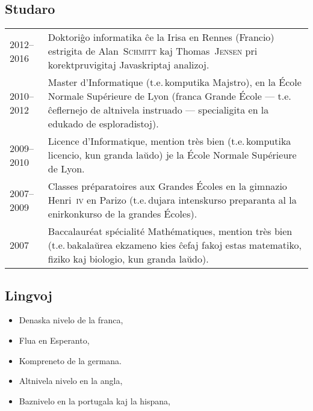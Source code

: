 \documentclass[12pt,a4paper]{article}
\makeatletter
\newcommand{\fr}[1]{\foreignlanguage{french}{{#1}}}
\newcommand{\fr}[1]{\foreignlanguage{french}{{#1}}}
\newcommand{\ie}{t.e.\,}
\newenvironment{datecvsection}[1]%
               {\subsection*{#1}%
                 \noindent \begin{tabular}{@{}p{\annee}p{\texte}@{}}}
               {\end{tabular}}
\newenvironment{cvsection}[1]%
               {\subsection*{#1}}
               {}
\newcommand\familyName{\textsc}
\newcommand\placeName{}
\makeatother
\begin{document}
\begin{datecvsection}{Studaro}

    2012–2016 & Doktoriĝo informatika ĉe la \placeName{Irisa} en \placeName{Rennes} (\placeName{Francio}) estrigita de Alan~\familyName{Schmitt} kaj Thomas~\familyName{Jensen} pri korektpruvigitaj {Javaskript}aj analizoj. \\

    2010–2012 & \fr{Master d’Informatique} (\ie komputika Majstro), en la \fr{\placeName{École Normale Supérieure de Lyon}} (franca \fr{Grande École} — \ie ĉeflernejo de altnivela instruado — specialigita en la edukado de esploradistoj). \\

    2009–2010 & \fr{Licence d’Informatique, mention très bien} (\ie komputika licencio, kun granda laŭdo) je la \fr{\placeName{École Normale Supérieure de Lyon}}. \\

    2007–2009 & \fr{Classes préparatoires aux Grandes Écoles} en la gimnazio \placeName{Henri~\textsc{iv}} en \placeName{Parizo} (\ie dujara intenskurso preparanta al la enirkonkurso de la \fr{grandes Écoles}). \\

    2007 & \fr{Baccalauréat spécialité Mathématiques, mention très bien} (\ie bakalaŭrea ekzameno kies ĉefaj fakoj estas matematiko, fiziko kaj biologio, kun granda laŭdo). \\

\end{datecvsection}

\begin{cvsection}{Lingvoj}
\parbox{.4\textwidth}{
\begin{itemize}
   \item Denaska nivelo de la franca,
   \item Flua en Esperanto,
   \item Kompreneto de la germana.
\end{itemize}}
\parbox{.55\textwidth}{
\begin{itemize}
   \item Altnivela nivelo en la angla,
   \item Baznivelo en la portugala kaj la hispana,
\end{itemize}}
\end{cvsection}
\end{document}

